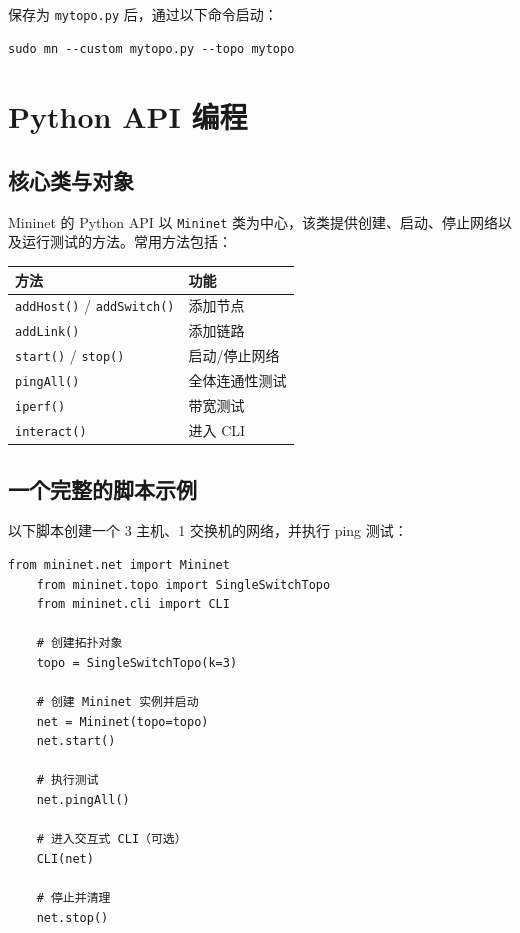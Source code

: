 \documentclass[12pt,a4paper,openany]{ctexbook}
\begin{document}
保存为 \texttt{mytopo.py} 后，通过以下命令启动：

\begin{lstlisting}[style=bashstyle]
	sudo mn --custom mytopo.py --topo mytopo
\end{lstlisting}


\chapter{Python API 编程}

\section{核心类与对象}

Mininet 的 Python API 以 \texttt{Mininet} 类为中心，该类提供创建、启动、停止网络以及运行测试的方法。常用方法包括：

\begin{center}
	\begin{tabular}{@{}ll@{}}
		\toprule
		\textbf{方法} & \textbf{功能} \\
		\midrule
		\texttt{addHost()} / \texttt{addSwitch()} & 添加节点 \\
		\texttt{addLink()} & 添加链路 \\
		\texttt{start()} / \texttt{stop()} & 启动/停止网络 \\
		\texttt{pingAll()} & 全体连通性测试 \\
		\texttt{iperf()} & 带宽测试 \\
		\texttt{interact()} & 进入 CLI \\
		\bottomrule
	\end{tabular}
\end{center}

\section{一个完整的脚本示例}

以下脚本创建一个 3 主机、1 交换机的网络，并执行 ping 测试：

\begin{lstlisting}[style=mininetstyle]
	from mininet.net import Mininet
	from mininet.topo import SingleSwitchTopo
	from mininet.cli import CLI
	
	# 创建拓扑对象
	topo = SingleSwitchTopo(k=3)
	
	# 创建 Mininet 实例并启动
	net = Mininet(topo=topo)
	net.start()
	
	# 执行测试
	net.pingAll()
	
	# 进入交互式 CLI（可选）
	CLI(net)
	
	# 停止并清理
	net.stop()
\end{lstlisting}
\end{document}
